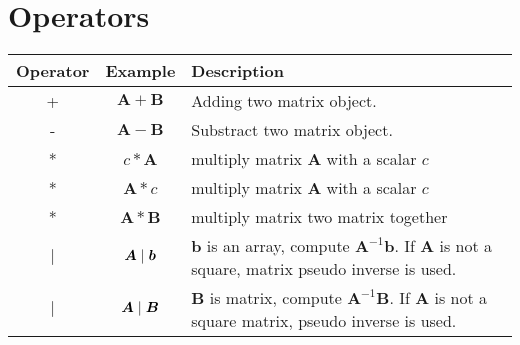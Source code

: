 \documentclass[a4paper]{article}
\begin{document}
\section{Operators} 
	\begin{tabular}{|c|c|l|} 
		\hline
		Operator & Example & Description    \\  
		\hline
		+& $\boldsymbol{A} + \boldsymbol{B} $ & Adding two matrix object.  \\
		-& $\boldsymbol{A} - \boldsymbol{B}$ & Substract two matrix object.  \\
		*&   $c*\boldsymbol{A}$  &  multiply matrix $\boldsymbol{A}$ with a scalar $c$  \\
		*& $\boldsymbol{A}*c$ & multiply matrix $\boldsymbol{A}$ with a scalar $c$  \\
		*& $\boldsymbol{A}*\boldsymbol{B}$ &  multiply matrix two matrix together  \\
		$|$& $\boldsymbol{A} \hspace{0.1cm} | \hspace{0.1cm} \boldsymbol{b}$ & $\boldsymbol{b}$ is an array, compute $\boldsymbol{A}^{-1} \boldsymbol{b}$.  If  $\boldsymbol{A}$ is not a square, matrix pseudo inverse is used. \\
		$|$& $\boldsymbol{A} \hspace{0.1cm} | \hspace{0.1cm} \boldsymbol{B}$  &  $\boldsymbol{B}$ is matrix, compute $\boldsymbol{A}^{-1} \boldsymbol{B}$. If  $\boldsymbol{A}$ is not a square matrix, pseudo inverse is used. \\
		\hline
	\end{tabular} 
\end{document}
